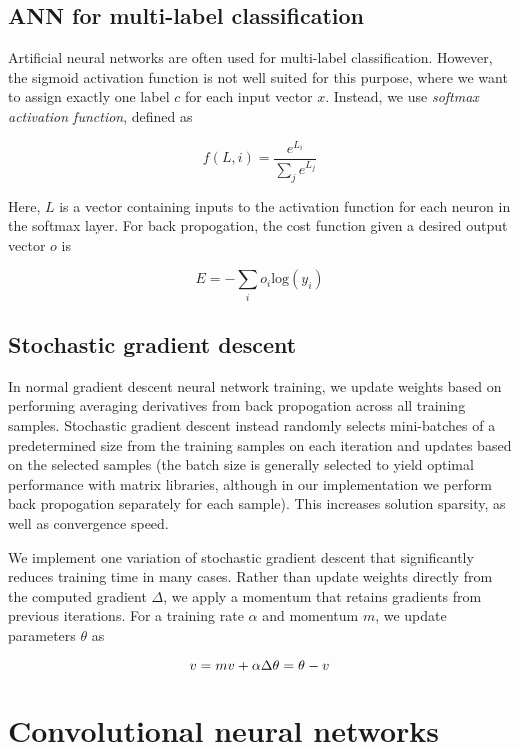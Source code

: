 \documentclass[10pt,twocolumn]{article}
\begin{document}
\subsection{ANN for multi-label classification}

Artificial neural networks are often used for multi-label classification. However, the sigmoid activation function is not well suited for this purpose, where we want to assign exactly one label $c$ for each input vector $x$. Instead, we use \emph{softmax activation function}, defined as

$$f(L, i) = \frac{e^{L_i}}{\sum_j e^{L_j}}$$

Here, $L$ is a vector containing inputs to the activation function for each neuron in the softmax layer. For back propogation, the cost function given a desired output vector $o$ is

$$E = -\sum_i o_i \text{log}(y_i)$$


\subsection{Stochastic gradient descent}

In normal gradient descent neural network training, we update weights based on performing averaging derivatives from back propogation across all training samples. Stochastic gradient descent instead randomly selects mini-batches of a predetermined size from the training samples on each iteration and updates based on the selected samples (the batch size is generally selected to yield optimal performance with matrix libraries, although in our implementation we perform back propogation separately for each sample). This increases solution sparsity, as well as convergence speed.

We implement one variation of stochastic gradient descent that significantly reduces training time in many cases. Rather than update weights directly from the computed gradient $\Delta$, we apply a momentum that retains gradients from previous iterations. For a training rate $\alpha$ and momentum $m$, we update parameters $\theta$ as


$$v = mv + \alpha \Delta \\
\theta = \theta - v$$

\section{Convolutional neural networks} \label{sec:cnn}
\end{document}
